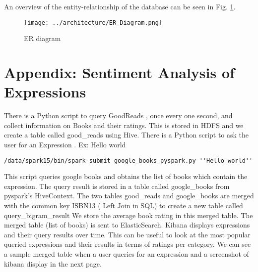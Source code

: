 \documentclass[12pt,letterpaper]{article}
\begin{document}
An overview of the entity-relationship of the database can be seen in Fig. \ref{ER}.


\begin{figure}[!ht]
\texttt{[image: ../architecture/ER\_Diagram.png]}
\caption{ER diagram \label{ER}}
\end{figure}

\appendix

\section{Appendix: Sentiment Analysis of Expressions}

There is a Python script to query GoodReads , once every one second, and collect information on Books and their ratings. This is stored in HDFS and we create a table called good\_reads using Hive.
There is a Python script to ask the user for an Expression . Ex: Hello world
\begin{verbatim}/data/spark15/bin/spark-submit google_books_pyspark.py ''Hello world'' \end{verbatim}
This script queries google books and obtains the list of books which contain the expression.
The query result is stored in a table called google\_books from pyspark's HiveContext.
The two tables good\_reads and google\_books are merged with the common key ISBN13 ( Left Join in SQL)  to create a new  table called query\_bigram\_result
We store the average book rating in this merged table.
The merged table (list of books) is sent to ElasticSearch. 
Kibana displays expressions and  their query results over time. This can be useful to look at the most popular queried expressions and their results in terms of ratings per category.
We can see a sample merged table when a user queries for an expression and a screenshot of kibana display in the next page.
\end{document}
